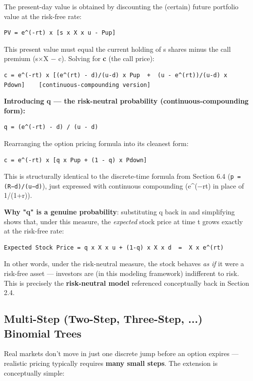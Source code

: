 \documentclass[12pt,openany]{book}
\theoremstyle{definition}
\theoremstyle{remark}
\begin{document}
The present-day value is obtained by discounting the (certain) future portfolio value at the risk-free rate:
\begin{lstlisting}[style=notesCode]
PV = e^(-rt) x [s x X x u - Pup]
\end{lstlisting}

This present value must equal the current holding of s shares minus the call premium (s×X − c). Solving for \textbf{c} (the call price):
\begin{lstlisting}[style=notesCode]
c = e^(-rt) x [(e^(rt) - d)/(u-d) x Pup  +  (u - e^(rt))/(u-d) x Pdown]    [continuous-compounding version]
\end{lstlisting}

\textbf{Introducing q — the risk-neutral probability (continuous-compounding form):}
\begin{lstlisting}[style=notesCode]
q = (e^(-rt) - d) / (u - d)
\end{lstlisting}
Rearranging the option pricing formula into its cleanest form:
\begin{lstlisting}[style=notesCode]
c = e^(-rt) x [q x Pup + (1 - q) x Pdown]
\end{lstlisting}

This is structurally identical to the discrete-time formula from Section 6.4 (\texttt{p = (R−d)/(u−d)}), just expressed with continuous compounding (e\textasciicircum{}(−rt) in place of 1/(1+r)).

\textbf{Why "q" is a genuine probability}: substituting q back in and simplifying shows that, under this measure, the \emph{expected} stock price at time t grows exactly at the risk-free rate:
\begin{lstlisting}[style=notesCode]
Expected Stock Price = q x X x u + (1-q) x X x d  =  X x e^(rt)
\end{lstlisting}
In other words, under the risk-neutral measure, the stock behaves \emph{as if} it were a risk-free asset — investors are (in this modeling framework) indifferent to risk. This is precisely the \textbf{risk-neutral model} referenced conceptually back in Section 2.4.

\subsection{Multi-Step (Two-Step, Three-Step, ...) Binomial Trees}

Real markets don't move in just one discrete jump before an option expires — realistic pricing typically requires \textbf{many small steps}. The extension is conceptually simple:
\end{document}
